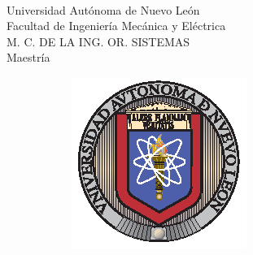 \thispagestyle{empty}
\vspace{10 cm}
\begin{scshape}
\begin{center}
	{$\,$} \\[20 mm]
	{\Large{Universidad Autónoma de Nuevo León}} \\[5mm]
	{\large{Facultad de Ingeniería Mecánica y Eléctrica}} \\[5mm]
	{\large{M. C. DE LA ING. OR. SISTEMAS}} \\[5 mm]
	{\large{Maestría}}
	\vskip16mm
	\begin{figure}[h!]
		\centering
		\begin{subfigure}{0.3\linewidth}
			\includegraphics[width=\linewidth]{Figuras/uanl}
		\end{subfigure}
		\hspace{15 mm}
		\begin{subfigure}{0.2\linewidth}

\end{subfigure}
\end{figure}
\end{center}
\end{scshape}
